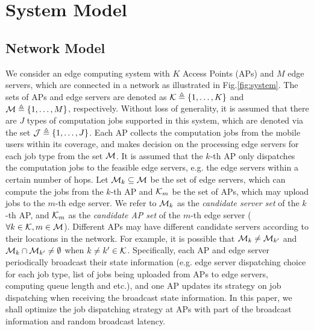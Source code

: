 \section{System Model}
\subsection{Network Model}
We consider an edge computing system with $K$ Access Points (APs) and $M$ edge servers, which are connected in a network as illustrated in Fig.\ref{fig:system}.
The sets of APs and edge servers are denoted as $\mathcal{K} \triangleq \{1,\dots,K\}$ and $\mathcal{M} \triangleq \{1,\dots,M\}$, respectively.
Without loss of generality, it is assumed that there are $J$ types of computation jobs supported in this system, which are denoted via the set $\mathcal{J} \triangleq \{1,\dots,J\}$.
Each AP collects the computation jobs from the mobile users within its coverage, and makes decision on the processing edge servers for each job type from the set $\mathcal{M}$.
It is assumed that the $k$-th AP only dispatches the computation jobs to the feasible edge servers, e.g. the edge servers within a certain number of hops.
Let $\mathcal{M}_{k} \subseteq \mathcal{M}$ be the set of edge servers, which can compute the jobs from the $k$-th AP and $\mathcal{K}_{m}$ be the set of APs, which may upload jobs to the $m$-th edge server.
We refer to $\mathcal{M}_{k}$ as the \emph{candidate server set} of the $k$-th AP, and $\mathcal{K}_{m}$ as the \emph{candidate AP set} of the $m$-th edge server ($\forall k\in\mathcal{K}, m\in\mathcal{M}$).
Different APs may have different candidate servers according to their locations in the network.
For example, it is possible that $\mathcal{M}_{k} \neq \mathcal{M}_{k'}$ and $\mathcal{M}_{k} \cap \mathcal{M}_{k'} \neq \emptyset$ when $k \neq k' \in \mathcal{K}$.
Specifically, each AP and edge server periodically broadcast their state information (e.g. edge server dispatching choice for each job type, list of jobs being uploaded from APs to edge servers, computing queue length and etc.), and one AP updates its strategy on job dispatching when receiving the broadcast state information.
In this paper, we shall optimize the job dispatching strategy at APs with part of the broadcast information and random broadcast latency.

